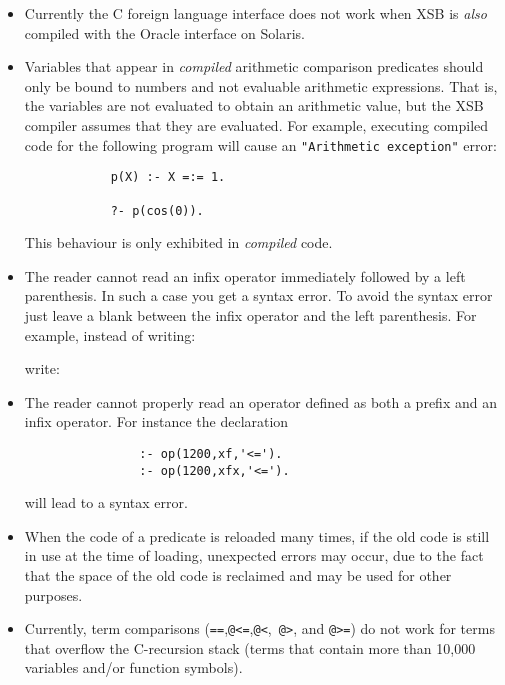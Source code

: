 \begin{itemize}
%
\item Currently the C foreign language interface does not work when
      XSB is {\em also} compiled with the Oracle interface on Solaris.
\item Variables that appear in {\em compiled} arithmetic comparison
      predicates should only be bound to numbers and not evaluable
      arithmetic expressions.  That is, the variables are not evaluated
      to obtain an arithmetic value, but the XSB compiler assumes
      that they are evaluated.  For example, executing compiled code for
      the following program will cause an {\tt "Arithmetic exception"}
      error:
      \begin{verbatim}
            p(X) :- X =:= 1.

            ?- p(cos(0)).
      \end{verbatim}
      This behaviour is only exhibited in {\em compiled} code.
\item The reader cannot read an infix operator immediately followed 
      by a left parenthesis.  In such a case you get a syntax error.
      To avoid the syntax error just leave a blank between the infix
      operator and the left parenthesis.  For example, instead of 
      writing:


      \noindent
      write:

%
\item The reader cannot properly read an operator defined as both a
      prefix and an infix operator.  For instance the declaration 
      \begin{verbatim}
                :- op(1200,xf,'<=').
                :- op(1200,xfx,'<=').
      \end{verbatim}
      will lead to a syntax error.
%
\item When the code of a predicate is reloaded many times, if the old 
      code is still in use at the time of loading, unexpected errors may 
      occur, due to the fact that the space of the old code is reclaimed
      and may be used for other purposes.
\item Currently, term comparisons ({\tt ==},{\tt @<=},{\tt @<},{\tt
      @>}, and {\tt @>=}) do not work for terms that overflow the
      C-recursion stack (terms that contain more than 10,000 variables
      and/or function symbols).
\end{itemize}

